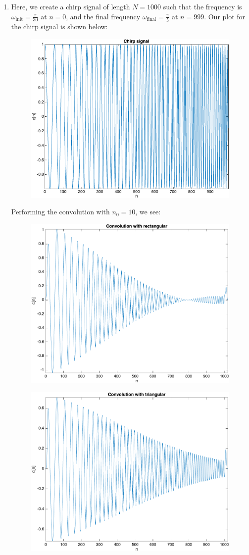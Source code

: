 \documentclass[12pt]{article}
\begin{document}
\begin{enumerate}[label=\textbf{\alph*)}, leftmargin=2.6em]
\item Here, we create a chirp signal of length $N=1000$ such that the frequency is $\omega_{\text{init}}=\frac{\pi}{30}$ at $n=0$, and the final frequency $\omega_{\text{final}}=\frac{\pi}{5}$ at $n=999$. Our plot for the chirp signal is shown below:
\begin{figure} [H]
    \centering
    \includegraphics[width=0.75\linewidth]{19.png}
\end{figure}
Performing the convolution with $n_0=10$, we see:
\begin{figure} [H]
    \centering
    \includegraphics[width=0.75\linewidth]{20.png}
\end{figure}
\begin{figure} [H]
    \centering
    \includegraphics[width=0.75\linewidth]{21.png}

\end{figure}
\end{enumerate}
\end{document}
